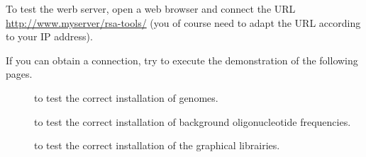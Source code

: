 \documentclass{article}
\begin{document}
To test the werb server, open a web browser and connect the URL
\url{http://www.myserver/rsa-tools/} (you of course need to adapt the
 URL according to your IP address).

If you can obtain a connection, try to execute the demonstration of
the following pages.

\begin{description}
\item[] to test the correct installation of genomes. 

\item[] to test the correct installation of
background oligonucleotide frequencies.

\item[] to test the correct installation of the
graphical librairies.

\end{description}
\end{document}
